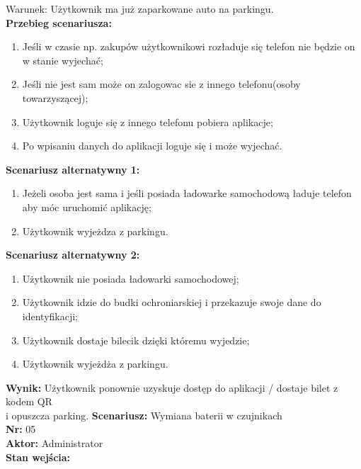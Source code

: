 \documentclass[12pt,a4paper]{article}
\begin{document}
Warunek: Użytkownik ma już zaparkowane auto na parkingu.
\\{\bf Przebieg scenariusza:}
\begin{enumerate}
\item Jeśli w czasie np. zakupów użytkownikowi rozładuje się telefon nie będzie on w stanie wyjechać;
\item Jeśli nie jest sam może on zalogowac sie z innego telefonu(osoby towarzyszącej);
\item Użytkownik loguje się z innego telefonu pobiera aplikacje;
\item Po wpisaniu danych do aplikacji loguje się i może wyjechać.
\end{enumerate}
{\bf Scenariusz alternatywny 1:}
\begin{enumerate}
\item Jeżeli osoba jest sama i jeśli posiada ładowarke samochodową ładuje telefon aby móc uruchomić aplikację;
\item Użytkownik wyjeżdza z parkingu.
\end{enumerate}
{\bf Scenariusz alternatywny 2:}
\begin{enumerate}
\item Użytkownik nie posiada ładowarki samochodowej;
\item Użytkownik idzie do budki ochroniarskiej i przekazuje swoje dane do identyfikacji;
\item Użytkownik dostaje bilecik dzięki któremu wyjedzie;
\item Użytkownik wyjeżdża z parkingu.
\end{enumerate}
{\bf Wynik:} Użytkownik ponownie uzyskuje dostęp do aplikacji / dostaje bilet z kodem QR\\i opuszcza parking.
\newline\newline\newline\newline\newline\newline\newline\newline\newline\newline\newline\newline\newline\newline\newline\newline
{\large \bf Scenariusz:} Wymiana baterii w czujnikach
\\{\bf Nr:} 05
\\{\bf Aktor:} Administrator
\\{\bf Stan wejścia:}
\end{document}
